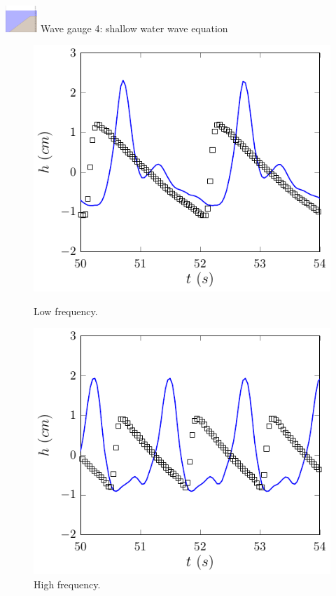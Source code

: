 \documentclass[pdf]{beamer}
\begin{document}
\begin{frame}{\includegraphics[width=1.2cm]{./Pics/WT4z.pdf} \hspace{1cm} Wave gauge 4: shallow water wave equation  }
	\begin{figure}
		\centering
		\begin{minipage}{.5\textwidth}
			\centering
			\includegraphics[width=0.9\linewidth]{./Pics/SL/WG4/1SWW-figure0.pdf}
			\caption{Low frequency.}
		\end{minipage}%
		\begin{minipage}{.5\textwidth}
			\centering
			\includegraphics[width=0.9\linewidth]{./Pics/SH/WG4/1SWW-figure0.pdf}
			\caption{High frequency.}
		\end{minipage}
	\end{figure}
\end{frame}
\end{document}
